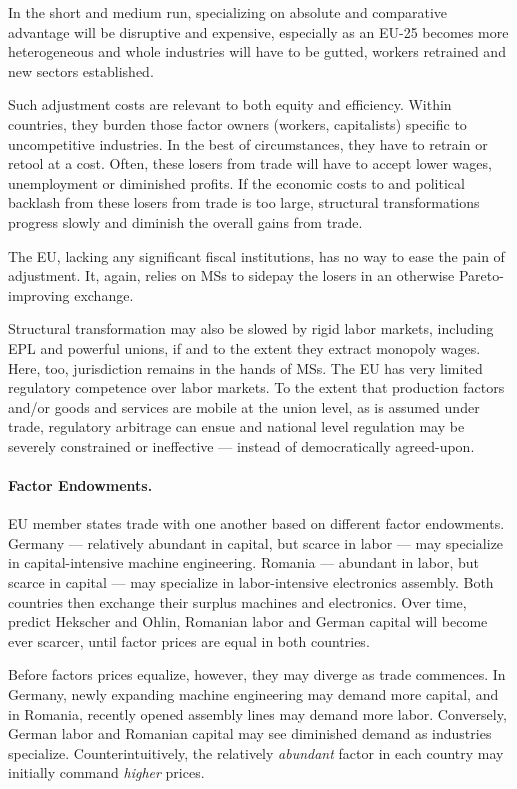 \documentclass[11pt,a4paper,oneside]{article}
\begin{document}
In the short and medium run, specializing on absolute and comparative advantage will be disruptive and expensive, especially as an \gls{EU}-25 becomes more heterogeneous and whole industries will have to be gutted, workers retrained and new sectors established.

Such adjustment costs are relevant to both equity and efficiency. Within countries, they burden those factor owners (workers, capitalists) specific to uncompetitive industries.
In the best of circumstances, they have to retrain or retool at a cost.
Often, these losers from trade will have to accept lower wages, unemployment or diminished profits.
If the economic costs to and political backlash from these losers from trade is too large, structural transformations progress slowly and diminish the overall gains from trade.

The \gls{EU}, lacking any significant fiscal institutions, has no way to ease the pain of adjustment.
It, again, relies on \glspl{MS} to sidepay the losers in an otherwise Pareto-improving exchange. %

Structural transformation may also be slowed by rigid labor markets, including \gls{EPL} and powerful unions, if and to the extent they extract monopoly wages.
Here, too, jurisdiction remains in the hands of \glspl{MS}.
The \gls{EU} has very limited regulatory competence over labor markets.
To the extent that production factors and/or goods and services are mobile at the union level, as is assumed under trade, regulatory arbitrage can ensue and national level regulation may be severely constrained or ineffective --- instead of democratically agreed-upon.

\paragraph{Factor Endowments.}
\gls{EU} member states trade with one another based on different factor endowments. Germany --- relatively abundant in capital, but scarce in labor --- may specialize in capital-intensive machine engineering.
Romania --- abundant in labor, but scarce in capital --- may specialize in labor-intensive electronics assembly.
Both countries then exchange their surplus machines and electronics.
Over time, predict Hekscher and Ohlin, Romanian labor and German capital will become ever scarcer, until factor prices are equal in both countries. %

Before factors prices equalize, however, they may diverge as trade commences.
In Germany, newly expanding machine engineering may demand more capital, and in Romania, recently opened assembly lines may demand more labor.
Conversely, German labor and Romanian capital may see diminished demand as industries specialize.
Counterintuitively, the relatively \emph{abundant} factor in each country may initially command \emph{higher} prices.
\end{document}
